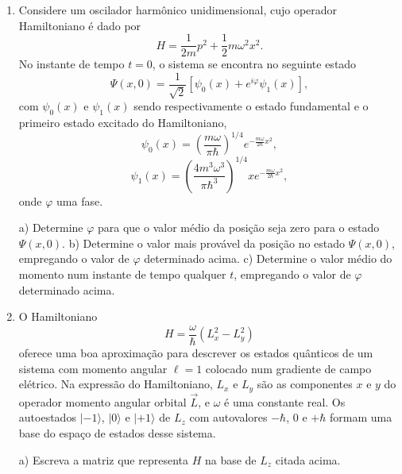 \begin{enumerate}[start=1,label={\bfseries Q\arabic*.}]
\item Considere um oscilador harmônico unidimensional, cujo operador Hamiltoniano é dado por
$$ H = \frac{1}{2m} p^{2} + \frac{1}{2} m \omega^{2} x^{2}. $$
No instante de tempo $t = 0$, o sistema se encontra no seguinte estado
$$ \Psi (x,0) = \frac{1}{\sqrt{2}} \left[  \psi_{0}(x) + e^{i\varphi} \psi_{1}(x) \right], $$
com $\psi_{0}(x)$ e $\psi_{1}(x)$ sendo respectivamente o estado fundamental e o primeiro estado excitado do Hamiltoniano,
$$ \psi_{0}(x) = \left( \frac{m\omega}{\pi \hbar} \right)^{1/4} e^{- \frac{m\omega}{2 \hbar} x^{2}}, $$
$$ \psi_{1}(x) = \left( \frac{4 m^{3} \omega^{3} }{\pi \hbar^{3} } \right)^{1/4} x e^{- \frac{m\omega}{2 \hbar} x^{2}}, $$
onde $\varphi$ uma fase.

  a) Determine $\varphi$ para que o valor médio da posição seja zero para o estado $\Psi(x,0)$.
  b) Determine o valor mais provável da posição no estado $\Psi(x,0)$, empregando o valor de $\varphi$ determinado acima.
  c) Determine o valor médio do momento num instante de tempo qualquer $t$, empregando o valor de $\varphi$ determinado acima.




\item O Hamiltoniano
$$ H = \frac{\omega}{\hbar} \left( L_{x}^{2} - L_{y}^{2}  \right) $$
oferece uma boa aproximação para descrever os estados quânticos de um sistema com momento angular $\ell = 1$ colocado num gradiente de campo elétrico. Na expressão do Hamiltoniano, $L_{x}$ e $L_{y}$ são as componentes $x$ e $y$ do operador momento angular orbital $\vec{L}$, e $\omega$ é uma constante real. Os autoestados $|-1 \rangle$, $|0 \rangle$ e $|+1 \rangle$ de $L_{z}$ com autovalores $-\hbar$, $0$ e $+\hbar$ formam uma base do espaço de estados desse sistema.

a) Escreva a matriz que representa $H$ na base de $L_{z}$ citada acima.


\end{enumerate}
